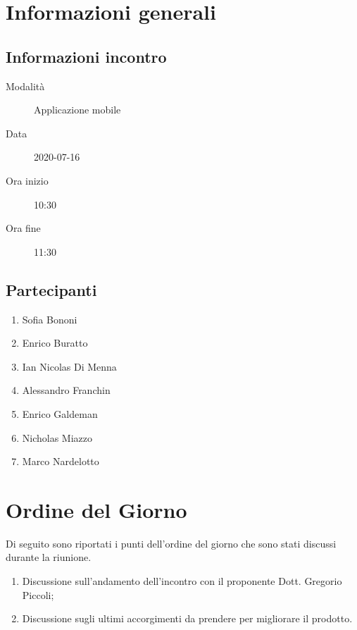\documentclass{article}
\begin{document}


\section{Informazioni generali}%
\label{sec:informazioni_generali}

\subsection{Informazioni incontro}%
\label{sub:informazioni_incontro}

\begin{description}
  \item[Modalità] Applicazione mobile 
  \item[Data] 2020-07-16
  \item[Ora inizio] 10:30
  \item[Ora fine] 11:30
\end{description}

\subsection{Partecipanti}%
\label{sub:partecipanti}

\begin{enumerate}
  \item Sofia Bononi
  \item Enrico Buratto
  \item Ian Nicolas Di Menna
  \item Alessandro Franchin
  \item Enrico Galdeman
  \item Nicholas Miazzo
  \item Marco Nardelotto
\end{enumerate}

\section{Ordine del Giorno}%
\label{ordine_del_giorno}
Di seguito sono riportati i punti dell'ordine del giorno che sono stati discussi durante la riunione.
\begin{enumerate}
  \item Discussione sull'andamento dell'incontro con il proponente Dott. Gregorio Piccoli;
  \item Discussione sugli ultimi accorgimenti da prendere per migliorare il prodotto.
\end{enumerate}
\end{document}
